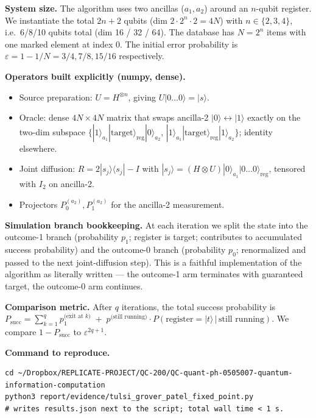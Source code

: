 \documentclass[11pt]{article}
\begin{document}
\textbf{System size.} The algorithm uses two ancillas (\(a_1, a_2\)) around
an \(n\)-qubit register. We instantiate the total \(2n+2\) qubits (dim
\(2\!\cdot\!2^n\!\cdot\!2 = 4N\)) with \(n\in\{2,3,4\}\), i.e.\ 6/8/10 qubits
total (dim 16 / 32 / 64). The database has \(N=2^n\) items with one marked
element at index 0. The initial error probability is
\(\varepsilon = 1 - 1/N = 3/4, 7/8, 15/16\) respectively.

\textbf{Operators built explicitly (numpy, dense).}
\begin{itemize}
  \item Source preparation: \(U = H^{\otimes n}\), giving
        \(U|0\ldots 0\rangle = |s\rangle\).
  \item Oracle: dense \(4N\times 4N\) matrix that swaps ancilla-2 \(|0\rangle\!\leftrightarrow\!|1\rangle\)
        exactly on the two-dim subspace \(\{|1\rangle_{a_1}|\text{target}\rangle_{\text{reg}}|0\rangle_{a_2},\, |1\rangle_{a_1}|\text{target}\rangle_{\text{reg}}|1\rangle_{a_2}\}\); identity elsewhere.
  \item Joint diffusion: \(R = 2|s_j\rangle\langle s_j| - I\) with
        \(|s_j\rangle = (H\otimes U)|0\rangle_{a_1}|0\ldots 0\rangle_{\text{reg}}\),
        tensored with \(I_2\) on ancilla-2.
  \item Projectors \(P^{(a_2)}_0, P^{(a_2)}_1\) for the ancilla-2 measurement.
\end{itemize}

\textbf{Simulation branch bookkeeping.} At each iteration we split
the state into the outcome-1 branch (probability \(p_1\); register
is target; contributes to accumulated success probability) and the
outcome-0 branch (probability \(p_0\); renormalized and passed to the
next joint-diffusion step). This is a faithful implementation of the
algorithm as literally written --- the outcome-1 arm terminates with
guaranteed target, the outcome-0 arm continues.

\textbf{Comparison metric.} After \(q\) iterations, the total success
probability is
\(P_\text{succ} = \sum_{k=1}^{q} p^{\text{(exit at $k$)}}_1 \;+\; p^{\text{(still running)}} \cdot P(\text{register}=|t\rangle\,|\,\text{still running})\).
We compare \(1 - P_\text{succ}\) to \(\varepsilon^{2q+1}\).

\textbf{Command to reproduce.}
\begin{lstlisting}
cd ~/Dropbox/REPLICATE-PROJECT/QC-200/QC-quant-ph-0505007-quantum-information-computation
python3 report/evidence/tulsi_grover_patel_fixed_point.py
# writes results.json next to the script; total wall time < 1 s.
\end{lstlisting}
\end{document}
